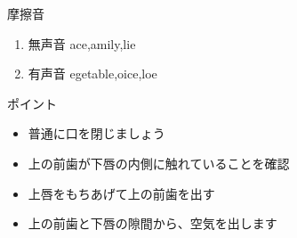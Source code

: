 \documentclass[aspectratio=169,xcolor={dvipsnames,table}]{beamer}
\begin{document}
 \begin{frame}[plain]{摩擦音}

\large

\begin{enumerate}
 \item  無声音 \hspace{22pt}ace,\hspace{1\zw}amily,\hspace{1\zw}lie
 \item  有声音 \hspace{20pt}egetable,\hspace{1\zw}oice,\hspace{1\zw}loe
\end{enumerate}


\vspace*{20pt}

\normalsize
ポイント

\begin{itemize}
 \item 普通に口を閉じましょう
 \item 上の前歯が下唇の内側に触れていることを確認
 \item 上唇をもちあげて上の前歯を出す
 \item 上の前歯と下唇の隙間から、空気を出します
\end{itemize}

\hfill{}

\end{frame}
\end{document}
